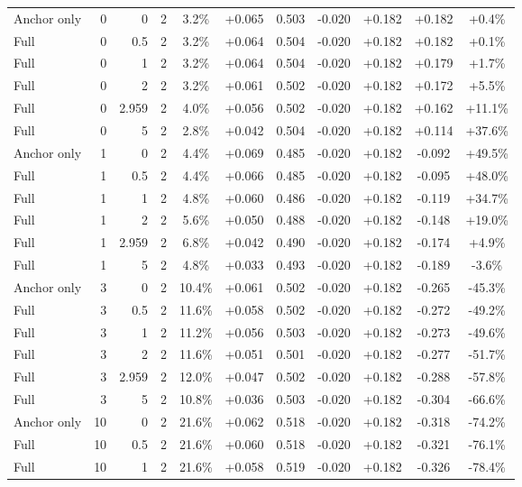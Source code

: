 \begin{table}[htbp]
\begin{tabular}{lrrrccccccc}
Anchor only & 0 & 0 & 2 & 3.2\% & +0.065 & 0.503 & -0.020 & +0.182 & +0.182 & +0.4\% \\
Full & 0 & 0.5 & 2 & 3.2\% & +0.064 & 0.504 & -0.020 & +0.182 & +0.182 & +0.1\% \\
Full & 0 & 1 & 2 & 3.2\% & +0.064 & 0.504 & -0.020 & +0.182 & +0.179 & +1.7\% \\
Full & 0 & 2 & 2 & 3.2\% & +0.061 & 0.502 & -0.020 & +0.182 & +0.172 & +5.5\% \\
Full & 0 & 2.959 & 2 & 4.0\% & +0.056 & 0.502 & -0.020 & +0.182 & +0.162 & +11.1\% \\
Full & 0 & 5 & 2 & 2.8\% & +0.042 & 0.504 & -0.020 & +0.182 & +0.114 & +37.6\% \\
Anchor only & 1 & 0 & 2 & 4.4\% & +0.069 & 0.485 & -0.020 & +0.182 & -0.092 & +49.5\% \\
Full & 1 & 0.5 & 2 & 4.4\% & +0.066 & 0.485 & -0.020 & +0.182 & -0.095 & +48.0\% \\
Full & 1 & 1 & 2 & 4.8\% & +0.060 & 0.486 & -0.020 & +0.182 & -0.119 & +34.7\% \\
Full & 1 & 2 & 2 & 5.6\% & +0.050 & 0.488 & -0.020 & +0.182 & -0.148 & +19.0\% \\
Full & 1 & 2.959 & 2 & 6.8\% & +0.042 & 0.490 & -0.020 & +0.182 & -0.174 & +4.9\% \\
Full & 1 & 5 & 2 & 4.8\% & +0.033 & 0.493 & -0.020 & +0.182 & -0.189 & -3.6\% \\
Anchor only & 3 & 0 & 2 & 10.4\% & +0.061 & 0.502 & -0.020 & +0.182 & -0.265 & -45.3\% \\
Full & 3 & 0.5 & 2 & 11.6\% & +0.058 & 0.502 & -0.020 & +0.182 & -0.272 & -49.2\% \\
Full & 3 & 1 & 2 & 11.2\% & +0.056 & 0.503 & -0.020 & +0.182 & -0.273 & -49.6\% \\
Full & 3 & 2 & 2 & 11.6\% & +0.051 & 0.501 & -0.020 & +0.182 & -0.277 & -51.7\% \\
Full & 3 & 2.959 & 2 & 12.0\% & +0.047 & 0.502 & -0.020 & +0.182 & -0.288 & -57.8\% \\
Full & 3 & 5 & 2 & 10.8\% & +0.036 & 0.503 & -0.020 & +0.182 & -0.304 & -66.6\% \\
Anchor only & 10 & 0 & 2 & 21.6\% & +0.062 & 0.518 & -0.020 & +0.182 & -0.318 & -74.2\% \\
Full & 10 & 0.5 & 2 & 21.6\% & +0.060 & 0.518 & -0.020 & +0.182 & -0.321 & -76.1\% \\
Full & 10 & 1 & 2 & 21.6\% & +0.058 & 0.519 & -0.020 & +0.182 & -0.326 & -78.4\% \\

\end{tabular}
\end{table}
